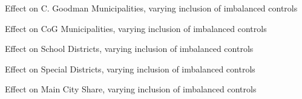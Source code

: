 \documentclass{article}
\begin{document}
\begin{landscape}
\begin{table}[htbp]
\footnotesize
\centering {}  \begin{threeparttable} \caption{Effect on C. Goodman Municipalities, varying inclusion of imbalanced controls} \label{tab:cgoodman_balance_iter}
     \end{threeparttable}
 \end{table}
\clearpage

\footnotesize
\begin{table}[htbp]
\footnotesize
\centering {}  \begin{threeparttable} \caption{Effect on CoG Municipalities, varying inclusion of imbalanced controls} \label{tab:gen_muni_balance_iter}
     \end{threeparttable}
 \end{table}
\clearpage


\footnotesize
\begin{table}[htbp]
\footnotesize
\centering {}  \begin{threeparttable} \caption{Effect on School Districts, varying inclusion of imbalanced controls} \label{tab:schdist_ind_balance_iter}
     \end{threeparttable}
 \end{table}
\clearpage


\footnotesize
\begin{table}[htbp]
\footnotesize
\centering {}  \begin{threeparttable} \caption{Effect on Special Districts, varying inclusion of imbalanced controls} \label{tab:spdist_balance_iter}
     \end{threeparttable}
 \end{table}
\clearpage


\footnotesize
\begin{table}[htbp]
\footnotesize
\centering {}  \begin{threeparttable} \caption{Effect on Main City Share, varying inclusion of imbalanced controls} \label{tab:totfrac_balance_iter}
     \end{threeparttable}
 \end{table}
\clearpage

\end{landscape}
\end{document}
